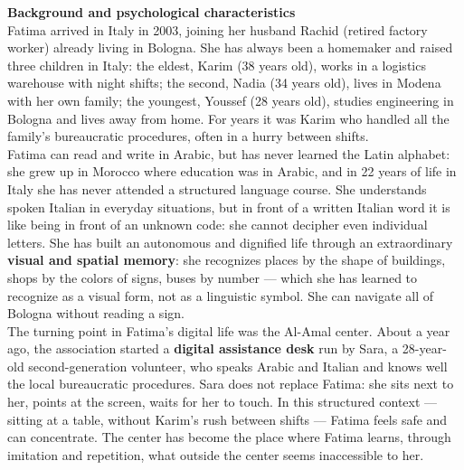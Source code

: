 ﻿\documentclass[11pt,a4paper]{article}
\begin{document}
\begin{center}


\begin{tcolorbox}[base]
    \textbf{Background and psychological characteristics} \\[4pt]
    {\small
    Fatima arrived in Italy in 2003, joining her husband
    Rachid (retired factory worker) already living in Bologna.
    She has always been a homemaker and raised three children
    in Italy: the eldest, Karim (38 years old), works in a
    logistics warehouse with night shifts; the second,
    Nadia (34 years old), lives in Modena with her own family;
    the youngest, Youssef (28 years old), studies engineering
    in Bologna and lives away from home. For years it was Karim
    who handled all the family's bureaucratic procedures,
    often in a hurry between shifts. \\[4pt]

    Fatima can read and write in Arabic, but has never
    learned the Latin alphabet: she grew up in Morocco where
    education was in Arabic, and in 22 years of life in Italy
    she has never attended a structured language course.
    She understands spoken Italian in everyday situations,
    but in front of a written Italian word it is like
    being in front of an unknown code:
    she cannot decipher even individual letters.
    She has built an autonomous and dignified life through
    an extraordinary \textbf{visual and spatial memory}:
    she recognizes places by the shape of buildings, shops
    by the colors of signs, buses by number ---
    which she has learned to recognize as a visual form,
    not as a linguistic symbol.
    She can navigate all of Bologna without reading a sign. \\[4pt]

    The turning point in Fatima's digital life
    was the Al-Amal center. About a year ago,
    the association started a \textbf{digital
    assistance desk} run by Sara, a
    28-year-old second-generation volunteer,
    who speaks Arabic and Italian and knows well
    the local bureaucratic procedures. Sara does not
    replace Fatima: she sits next to her, points
    at the screen, waits for her to touch.
    In this structured context --- sitting at a
    table, without Karim's rush between shifts
    --- Fatima feels safe and can
    concentrate. The center has become the place
    where Fatima learns, through imitation and repetition,
    what outside the center seems inaccessible to her. \\[4pt]

}
\end{tcolorbox}
\end{center}
\end{document}
